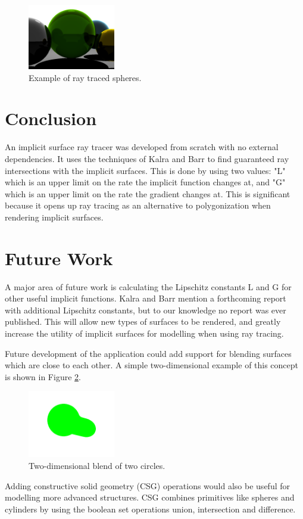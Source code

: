 \documentclass[conference]{acmsiggraph}
\begin{document}
\begin{figure}[ht]
  \centering
  \includegraphics[width=1.5in]{figures/spheres.png}
  \caption{Example of ray traced spheres.}
  \label{fig:spheres}
\end{figure}

\section{Conclusion}

An implicit surface ray tracer was developed from scratch with no external
dependencies.  It uses the techniques of Kalra and Barr \cite{KalraBarr1989}
to find guaranteed ray intersections with the implicit surfaces.  This is done
by using two values: "L" which is an upper limit on the rate the implicit
function changes at, and "G" which is an upper limit on the rate the gradient
changes at.  This is significant because it opens up ray tracing as an 
alternative to polygonization when rendering implicit surfaces.

\section{Future Work}

A major area of future work is calculating the Lipschitz constants L and G
for other useful implicit functions.  Kalra and Barr \cite{KalraBarr1989} 
mention a forthcoming report with additional Lipschitz constants, but to
our knowledge no report was ever published.  This will allow new types of
surfaces to be rendered, and greatly increase the utility of implicit 
surfaces for modelling when using ray tracing.

Future development of the application could add support for blending surfaces
which are close to each other.  A simple two-dimensional example of this concept
is shown in Figure \ref{fig:blend2d}.

\begin{figure}[ht]
  \centering
  \includegraphics[width=1.5in]{figures/blend2d.png}
  \caption{Two-dimensional blend of two circles.}
  \label{fig:blend2d}
\end{figure}

Adding constructive solid geometry (CSG) operations would also be useful
for modelling more advanced structures.  CSG combines primitives like 
spheres and cylinders by using the boolean set operations union,
intersection and difference.



\end{document}
